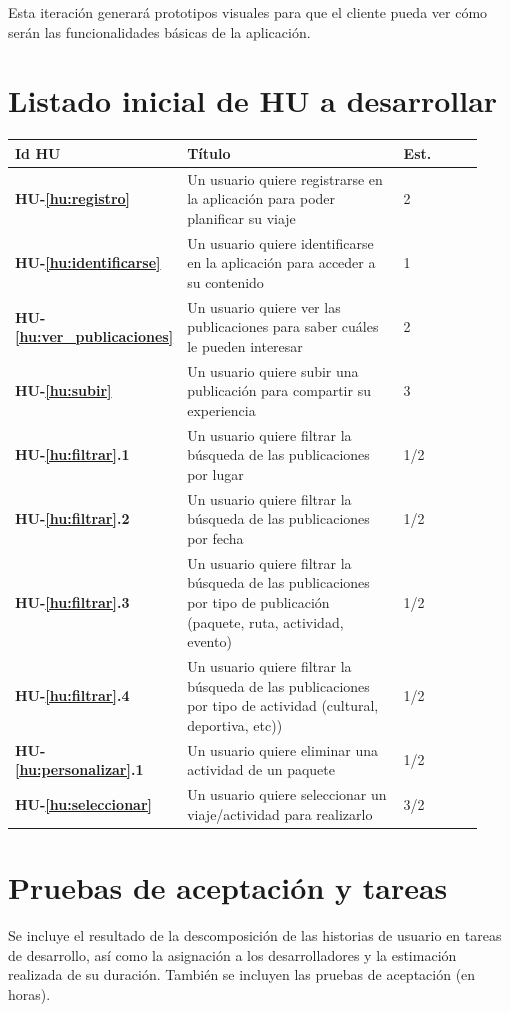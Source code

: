 \documentclass[11pt]{article}
\begin{document}
Esta iteración generará prototipos visuales para que el cliente pueda ver cómo serán las funcionalidades básicas de la aplicación.

\section{Listado inicial de HU a desarrollar}
\begin{longtable}{p{0.13\linewidth}p{0.65\linewidth}p{0.05\linewidth}p{0.05\linewidth}p{0.05\linewidth}}
	\toprule
	\textbf{Id HU} & \textbf{Título} & \textbf{Est.}\\
	\midrule
	\textbf{HU-\ref{hu:registro}} & Un usuario quiere registrarse en la aplicación para poder planificar su viaje & 2\\
	\textbf{HU-\ref{hu:identificarse}} & Un usuario quiere identificarse en la aplicación para  acceder a su contenido & 1\\
	\textbf{HU-\ref{hu:ver_publicaciones}} & Un usuario quiere ver las publicaciones para saber cuáles le pueden interesar & 2\\
	\textbf{HU-\ref{hu:subir}} & Un usuario quiere subir una publicación para compartir su experiencia & 3\\
	\textbf{HU-\ref{hu:filtrar}.1} & Un usuario quiere filtrar la búsqueda de las publicaciones por lugar & 1/2 \\ 
	\textbf{HU-\ref{hu:filtrar}.2} & Un usuario quiere filtrar la búsqueda de las publicaciones por fecha & 1/2 \\
	\textbf{HU-\ref{hu:filtrar}.3} & Un usuario quiere filtrar la búsqueda de las publicaciones por tipo de publicación (paquete, ruta, actividad, evento) & 1/2 \\
	\textbf{HU-\ref{hu:filtrar}.4} & Un usuario quiere filtrar la búsqueda de las publicaciones por tipo de actividad (cultural, deportiva, etc)) & 1/2 \\
	\textbf{HU-\ref{hu:personalizar}.1} & Un usuario quiere eliminar una actividad de un paquete & 1/2\\ 
	\textbf{HU-\ref{hu:seleccionar}} & Un usuario quiere seleccionar un viaje/actividad para realizarlo & 3/2 \\
	\bottomrule
\end{longtable}

\section{Pruebas de aceptación y tareas}
Se incluye el resultado de la descomposición de las historias de usuario en tareas de desarrollo, así como la asignación a los desarrolladores y la estimación realizada de su duración. También se incluyen las pruebas de aceptación (en horas).
\end{document}

